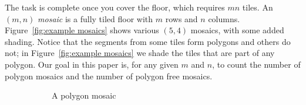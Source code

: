 \documentclass[12pt]{article}
\theoremstyle{plain}
\theoremstyle{remark}
\theoremstyle{definition}
\theoremstyle{remark}
\theoremstyle{definition}
\newcommand{\cell}[4]{ \draw[thick] ( #1 , #2 ) rectangle ( #3 , #4 );}
\newcommand{\cellA}[4]{ \draw[thick] ( #1 , #2 ) rectangle ( #3 , #4 ); \draw[red, thick, densely dotted] (#3 * 0.5 + #1 * 0.5 , #2) -- (#1, #4 * 0.5 + #2 * 0.5);}
\newcommand{\cellB}[4]{ \draw[thick] ( #1 , #2 ) rectangle ( #3 , #4 ); \draw[red, thick, densely dotted] (#3 * 0.5 + #1 * 0.5 , #2) -- (#3, #4 * 0.5 + #2 * 0.5);}
\newcommand{\cellC}[4]{ \draw[thick] ( #1 , #2 ) rectangle ( #3 , #4 ); \draw[red, thick, densely dotted] (#3 * 0.5 + #1 * 0.5 , #4) -- (#3, #4 * 0.5 + #2 * 0.5);}
\newcommand{\cellD}[4]{ \draw[thick] ( #1 , #2 ) rectangle ( #3 , #4 ); \draw[red, thick, densely dotted] (#3 * 0.5 + #1 * 0.5 , #4) -- (#1, #4 * 0.5 + #2 * 0.5);}
\newcommand{\cellE}[4]{ \draw[thick] ( #1 , #2 ) rectangle ( #3 , #4 ); \draw[red, thick, densely dotted] (#3, #4 * 0.5 + #2 * 0.5) -- (#1, #4 * 0.5 + #2 * 0.5);}
\newcommand{\cellF}[4]{ \draw[thick] ( #1 , #2 ) rectangle ( #3 , #4 ); \draw[red, thick, densely dotted] (#3 * 0.5 + #1 * 0.5 , #2) -- (#3 * 0.5 + #1 * 0.5 , #4);}
\newcommand{\cellAf}[4]{\filldraw[gray!80] ( #1 , #2 ) rectangle ( #3 , #4 ); \draw[thick] ( #1 , #2 ) rectangle ( #3 , #4 ); \draw[red, thick, densely dotted] (#3 * 0.5 + #1 * 0.5 , #2) -- (#1, #4 * 0.5 + #2 * 0.5);}
\newcommand{\cellBf}[4]{\filldraw[gray!80] ( #1 , #2 ) rectangle ( #3 , #4 ); \draw[thick] ( #1 , #2 ) rectangle ( #3 , #4 ); \draw[red, thick, densely dotted] (#3 * 0.5 + #1 * 0.5 , #2) -- (#3, #4 * 0.5 + #2 * 0.5);}
\newcommand{\cellCf}[4]{\filldraw[gray!80] ( #1 , #2 ) rectangle ( #3 , #4 ); \draw[thick] ( #1 , #2 ) rectangle ( #3 , #4 ); \draw[red, thick, densely dotted] (#3 * 0.5 + #1 * 0.5 , #4) -- (#3, #4 * 0.5 + #2 * 0.5);}
\newcommand{\cellDf}[4]{\filldraw[gray!80] ( #1 , #2 ) rectangle ( #3 , #4 ); \draw[thick] ( #1 , #2 ) rectangle ( #3 , #4 ); \draw[red, thick, densely dotted] (#3 * 0.5 + #1 * 0.5 , #4) -- (#1, #4 * 0.5 + #2 * 0.5);}
\newcommand{\cellEf}[4]{\filldraw[gray!80] ( #1 , #2 ) rectangle ( #3 , #4 ); \draw[thick] ( #1 , #2 ) rectangle ( #3 , #4 ); \draw[red, thick, densely dotted] (#3, #4 * 0.5 + #2 * 0.5) -- (#1, #4 * 0.5 + #2 * 0.5);}
\newcommand{\cellFf}[4]{\filldraw[gray!80] ( #1 , #2 ) rectangle ( #3 , #4 ); \draw[thick] ( #1 , #2 ) rectangle ( #3 , #4 ); \draw[red, thick, densely dotted] (#3 * 0.5 + #1 * 0.5 , #2) -- (#3 * 0.5 + #1 * 0.5 , #4);}
\begin{document}
\noindent The task is complete once you cover the floor, which requires $mn$ tiles. An $(m,n)$ \textit{mosaic} is a fully tiled floor with $m$ rows and $n$ columns. Figure~\ref{fig:example mosaics} shows various $(5,4)$ mosaics, with some added shading. Notice that the segments from some tiles form polygons and others do not; in Figure~\ref{fig:example mosaics} we shade the tiles that are part of any polygon. Our goal in this paper is, for any given $m$ and $n$, to count the number of polygon mosaics and the number of polygon free mosaics.

\begin{figure}[h!]
\begin{center}
\begin{subfigure}[t]{0.29\textwidth}
    \begin{center}
    \end{center}
    \caption{A polygon mosaic}
    \label{fig:example polygon mosaic}
\end{subfigure}
\hspace{0.05cm}
\begin{subfigure}[t]{0.29\textwidth}
    \begin{center}
\end{center}
\end{subfigure}
\end{center}
\end{figure}
\end{document}
